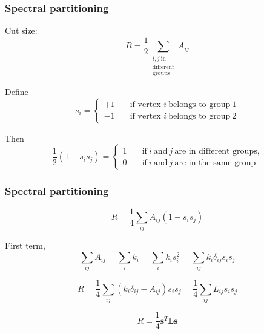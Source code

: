 \documentclass{beamer}
\begin{document}
\begin{frame}
    \frametitle{Spectral partitioning}
Cut size:
$$R = \frac{1}{2}\sum\limits_{\substack{i, j \ \text{in} \\ \text{different} \\ \text{groups}}}A_{ij}$$

Define
$$s_i = \begin{cases}+1 &\quad\text{if vertex } i\ \text{belongs to group} \ 1 \\-1 &\quad\text{if vertex } i\ \text{belongs to group} \ 2\end{cases}$$

Then
$$\frac{1}{2}(1-s_is_j) = \begin{cases}1 &\quad \text{if} \ i\ \text{and} \ j\ \text{are in different groups,}\\0 &\quad \text{if} \ i\ \text{and} \ j\ \text{are in the same group}\end{cases}$$
\end{frame}
\begin{frame}
    \frametitle{Spectral partitioning}
    $$R = \frac{1}{4}\sum\limits_{ij}A_{ij}(1-s_is_j)$$

First term,
$$\sum\limits_{ij}A_{ij} = \sum\limits_ik_i = \sum\limits_ik_is_i^2=\sum\limits_{ij}k_i\delta_{ij}s_is_j$$

$$R = \frac{1}{4}\sum\limits_{ij}(k_i\delta_{ij}-A_{ij})s_is_j = \frac{1}{4}\sum\limits_{ij}L_{ij}s_is_j$$

$$R = \frac{1}{4}{\mathbf s}^T{\mathbf L}{\mathbf s}$$
\end{frame}
\end{document}
